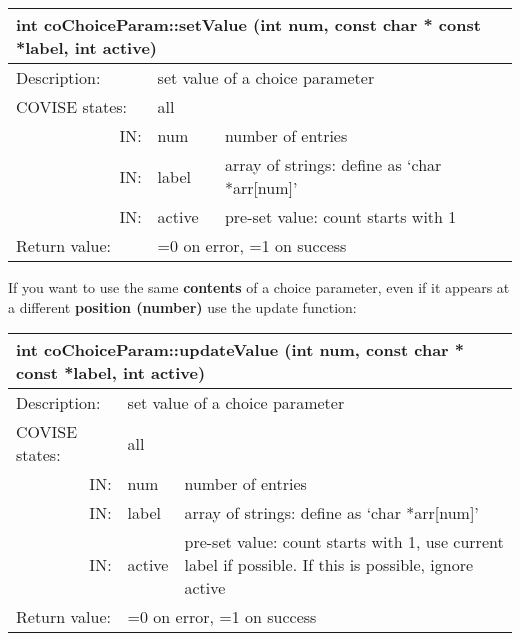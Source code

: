 \begin{longtable}{|p{4cm}|p{2.5cm}|p{7cm}|}
\hline
\multicolumn{3}{|p{13.5cm}|}{\bf int coChoiceParam::setValue\newline
                      (int num, const char * const *label, int active)} \\
\hline
{Description:}   
               & \multicolumn{2}{|p{9.5cm}|}{set value of a choice parameter} \\
\hline
{COVISE states:} & \multicolumn{2}{|p{9.5cm}|}{all} \\
\hline
\multicolumn{1}{|r|}{IN:} & {num} 
                             & {number of entries}\\
\hline
\multicolumn{1}{|r|}{IN:} & {label} 
                             & {array of strings:\newline
			                         define as `char *arr[num]'}\\
\hline
\multicolumn{1}{|r|}{IN:} & {active} 
                       & {pre-set value: count starts with 1}\\
\hline
{Return value:}  
                        & \multicolumn{2}{|p{9.5cm}|}{=0 on error, =1 on success} \endhead
\hline
\end{longtable}


If you want to use the same {\bf contents} of a choice parameter, even if it appears at a
different {\bf position (number)} use the update function:

\begin{longtable}{|p{4cm}|p{2.5cm}|p{7cm}|}
\hline
\multicolumn{3}{|p{13.5cm}|}{\bf int coChoiceParam::updateValue\newline
                      (int num, const char * const *label, int active)} \\
\hline
{Description:}   
               & \multicolumn{2}{|p{9.5cm}|}{set value of a choice parameter} \\
\hline
{COVISE states:} & \multicolumn{2}{|p{9.5cm}|}{all} \\
\hline
\multicolumn{1}{|r|}{IN:} & {num} 
                             & {number of entries}\\
\hline
\multicolumn{1}{|r|}{IN:} & {label} 
                             & {array of strings:\newline
			                         define as `char *arr[num]'}\\
\hline
\multicolumn{1}{|r|}{IN:} & {active} 
                       & {pre-set value: count starts with 1, 
		       use current label if possible. If this is possible, ignore active}\\
\hline
{Return value:}  
                        & \multicolumn{2}{|p{9.5cm}|}{=0 on error, =1 on success} \endhead
\hline
\end{longtable}

